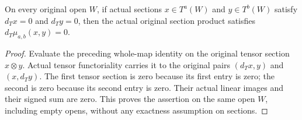 \begin{corollary}
\label{cor:di-cech-total-cup-closed}
\leanok
{}
On every original open $W$, if actual sections $x\in T^a(W)$ and
$y\in T^b(W)$ satisfy $d_Tx=0$ and $d_Ty=0$, then the actual original
section product satisfies $d_T\mu_{a,b}(x,y)=0$.
\end{corollary}
\begin{proof}
\leanok
Evaluate the preceding whole-map identity on the original tensor
section $x\otimes y$. Actual tensor functoriality carries it to the
original pairs $(d_Tx,y)$ and $(x,d_Ty)$. The first tensor section
is zero because its first entry is zero; the second is zero because
its second entry is zero. Their actual linear images and their
signed sum are zero. This proves the assertion on the same open
$W$, including empty opens, without any exactness assumption on
sections.
\end{proof}
